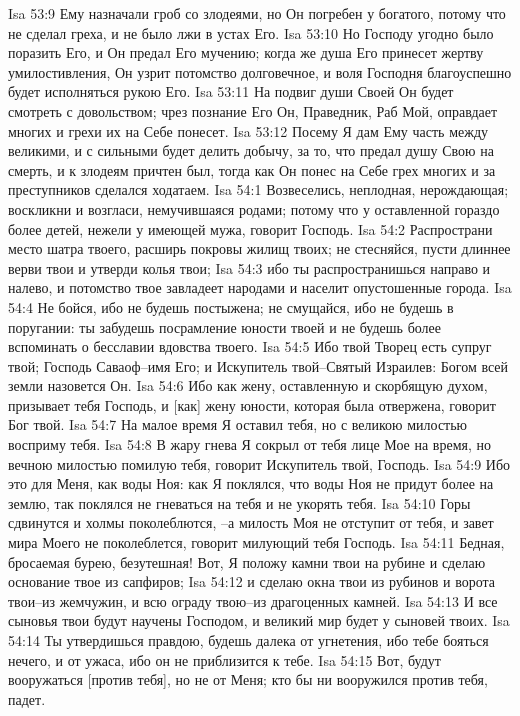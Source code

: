 Isa 53:9  Ему назначали гроб со злодеями, но Он погребен у богатого, потому что не сделал греха, и не было лжи в устах Его.
Isa 53:10  Но Господу угодно было поразить Его, и Он предал Его мучению; когда же душа Его принесет жертву умилостивления, Он узрит потомство долговечное, и воля Господня благоуспешно будет исполняться рукою Его.
Isa 53:11  На подвиг души Своей Он будет смотреть с довольством; чрез познание Его Он, Праведник, Раб Мой, оправдает многих и грехи их на Себе понесет.
Isa 53:12  Посему Я дам Ему часть между великими, и с сильными будет делить добычу, за то, что предал душу Свою на смерть, и к злодеям причтен был, тогда как Он понес на Себе грех многих и за преступников сделался ходатаем.
Isa 54:1  Возвеселись, неплодная, нерождающая; воскликни и возгласи, немучившаяся родами; потому что у оставленной гораздо более детей, нежели у имеющей мужа, говорит Господь.
Isa 54:2  Распространи место шатра твоего, расширь покровы жилищ твоих; не стесняйся, пусти длиннее верви твои и утверди колья твои;
Isa 54:3  ибо ты распространишься направо и налево, и потомство твое завладеет народами и населит опустошенные города.
Isa 54:4  Не бойся, ибо не будешь постыжена; не смущайся, ибо не будешь в поругании: ты забудешь посрамление юности твоей и не будешь более вспоминать о бесславии вдовства твоего.
Isa 54:5  Ибо твой Творец есть супруг твой; Господь Саваоф--имя Его; и Искупитель твой--Святый Израилев: Богом всей земли назовется Он.
Isa 54:6  Ибо как жену, оставленную и скорбящую духом, призывает тебя Господь, и [как] жену юности, которая была отвержена, говорит Бог твой.
Isa 54:7  На малое время Я оставил тебя, но с великою милостью восприму тебя.
Isa 54:8  В жару гнева Я сокрыл от тебя лице Мое на время, но вечною милостью помилую тебя, говорит Искупитель твой, Господь.
Isa 54:9  Ибо это для Меня, как воды Ноя: как Я поклялся, что воды Ноя не придут более на землю, так поклялся не гневаться на тебя и не укорять тебя.
Isa 54:10  Горы сдвинутся и холмы поколеблются, --а милость Моя не отступит от тебя, и завет мира Моего не поколеблется, говорит милующий тебя Господь.
Isa 54:11  Бедная, бросаемая бурею, безутешная! Вот, Я положу камни твои на рубине и сделаю основание твое из сапфиров;
Isa 54:12  и сделаю окна твои из рубинов и ворота твои--из жемчужин, и всю ограду твою--из драгоценных камней.
Isa 54:13  И все сыновья твои будут научены Господом, и великий мир будет у сыновей твоих.
Isa 54:14  Ты утвердишься правдою, будешь далека от угнетения, ибо тебе бояться нечего, и от ужаса, ибо он не приблизится к тебе.
Isa 54:15  Вот, будут вооружаться [против тебя], но не от Меня; кто бы ни вооружился против тебя, падет.

